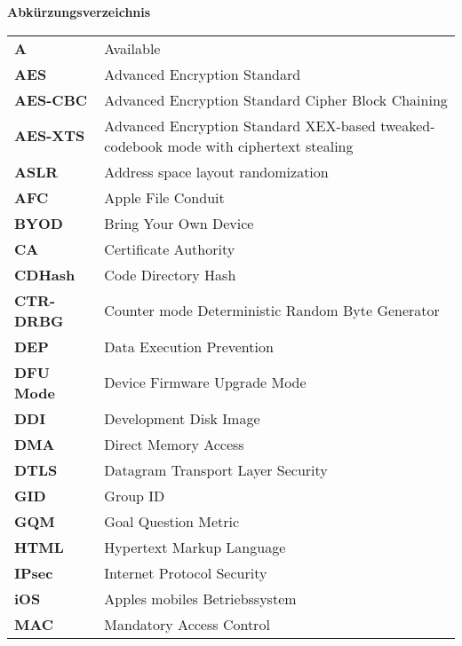 %
%
% 
% 
% 

\begin{center}
{\Large\bfseries Abkürzungsverzeichnis}
\end{center}

\begin{table*}[htbp]
		 \begin{tabular}{p{3cm}p{12cm}} 
            \textbf{A} & Available \\ 		 
		    \textbf{AES} & Advanced Encryption Standard \\
            \textbf{AES-CBC} & Advanced Encryption Standard Cipher Block Chaining \\
            \textbf{AES-XTS} & Advanced Encryption Standard XEX-based tweaked-codebook mode with ciphertext stealing \\ 
		     \textbf{ASLR} & Address space layout randomization \\
		     \textbf{AFC} & Apple File Conduit\\
		     \textbf{BYOD} & Bring Your Own Device\\
		     \textbf{CA} & Certificate Authority\\
		     \textbf{CDHash} & Code Directory Hash \\
		     \textbf{CTR-DRBG} & Counter mode Deterministic Random Byte Generator \\
		     \textbf{DEP} & Data Execution Prevention \\
		     \textbf{DFU Mode} & Device Firmware Upgrade Mode\\
		     \textbf{DDI} & Development Disk Image \\
		     \textbf{DMA} & Direct Memory Access\\
		     \textbf{DTLS} & Datagram Transport Layer Security \\
		     \textbf{GID} & Group ID \\
		     \textbf{GQM} & Goal Question Metric\\
		     \textbf{HTML} & Hypertext Markup Language \\
		     \textbf{IPsec} & Internet Protocol Security \\
		     \textbf{iOS} & Apples mobiles Betriebssystem\\
		     \textbf{MAC} & Mandatory Access Control \\

\end{tabular}
\end{table*}
